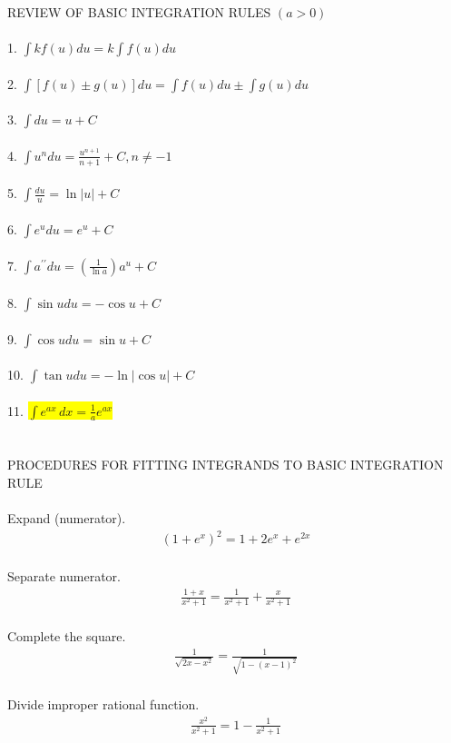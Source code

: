 \documentclass{report}
\begin{document}
REVIEW OF BASIC
INTEGRATION RULES $(a>0)$\\\\
1. $\int k f(u) d u=k \int f(u) d u$\\\\
2. $\int[f(u) \pm g(u)] d u= \int f(u) d u \pm \int g(u) d u$ \\\\
3. $\int d u=u+C$ \\\\
4. $\int u^n d u=\frac{u^{n+1}}{n+1}+C, n \neq-1$ \\\\
5. $\int \frac{d u}{u}=\ln |u|+C$ \\\\
6. $\int e^u d u=e^u+C$ \\\\
7. $\int a^{\prime \prime} d u=\left(\frac{1}{\ln a}\right) a^u+C$ \\\\
8. $\int \sin u d u=-\cos u+C$ \\\\
9. $\int \cos u d u=\sin u+C$ \\ \\
10. $\int \tan u d u=-\ln |\cos u|+C$ \\\\
11. \colorbox{yellow}{$\displaystyle \int e^{ax} \, dx = \frac{1}{a}e^{ax}$} \\\\\\


PROCEDURES FOR FITTING INTEGRANDS TO BASIC INTEGRATION RULE \\\\

Expand (numerator).
\begin{align*}
\left(1+e^x\right)^2=1+2 e^x+e^{2 x} \\
\end{align*}

Separate numerator.
\begin{align*}
	\frac{1+x}{x^2+1}=\frac{1}{x^2+1}+\frac{x}{x^2+1} \\
\end{align*}

Complete the square.
\begin{align*}
	\frac{1}{\sqrt{2 x-x^2}}=\frac{1}{\sqrt{1-(x-1)^2}} \\
\end{align*}

Divide improper rational function.
\begin{align*}
	\frac{x^2}{x^2+1}=1-\frac{1}{x^2+1} \\
\end{align*}
\end{document}
